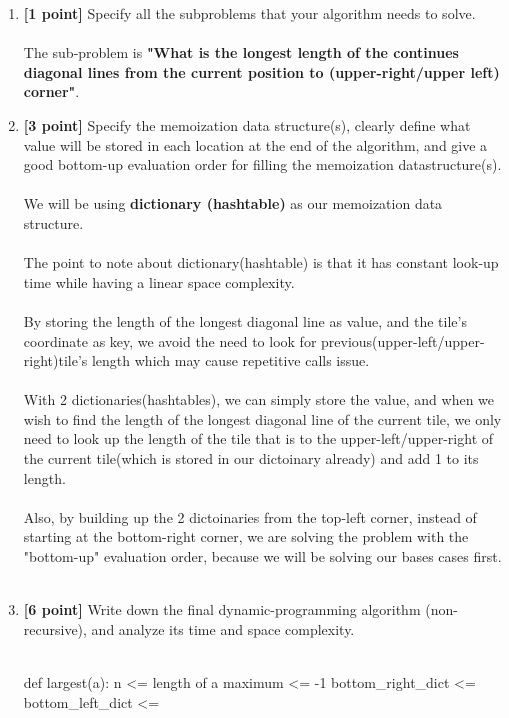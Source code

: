 \documentclass{assignment-373}
\begin{document}
\begin{enumerate}
\begin{center}
\end{center}


  \item \textbf{[1 point]} Specify all the subproblems that your
    algorithm needs to solve.\\\\
        The sub-problem is {\bf "What is the longest length of the continues diagonal lines from the current position to (upper-right/upper left) corner"}. \\
  \item \textbf{[3 point]} Specify the memoization data structure(s),
    clearly define what value will be stored in each location at the
    end of the algorithm, and give a good bottom-up evaluation order
    for filling the memoization datastructure(s).\\\\
    \phantom{=} \phantom{=} We will be using {\bf dictionary (hashtable)} as our memoization data structure.\\
    \\
    \phantom{=} \phantom{=} The point to note about dictionary(hashtable) is that it has constant look-up time while having a linear space complexity.\\
    \\
    \phantom{=} \phantom{=} By storing the length of the longest diagonal line as value, and the tile's coordinate as key, we avoid the need to look for previous(upper-left/upper-right)tile's length which may cause repetitive calls issue.\\
    \\
    \phantom{=} \phantom{=} With 2 dictionaries(hashtables), we can simply store the value, and when we wish to find the length of the longest diagonal line of the current tile, we only need to look up the length of the tile that is to the upper-left/upper-right of the current tile(which is stored in our dictoinary already) and add 1 to its length.\\
    \\
    \phantom{=} \phantom{=} Also, by building up the 2 dictoinaries from the top-left corner, instead of starting at the bottom-right corner, we are solving the problem with the "bottom-up" evaluation order, because we will be solving our bases cases first.\\
    
    \\
  \item \textbf{[6 point]} Write down the final
    dynamic-programming algorithm (non-recursive), and analyze its
    time and space complexity.\\\\
         \begin{python}
def largest(a):
    n <= length of a
    maximum <= -1
    bottom_right_dict <= {}
    bottom_left_dict <= {}
    

\end{python}
\end{enumerate}
\end{document}
